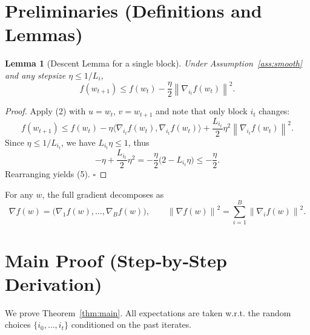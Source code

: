 \documentclass{article}
\newtheorem{lemma}{Lemma}
\newcommand{\norm}[1]{\left\|#1\right\|}
\newcommand{\grad}{\nabla}
\begin{document}
\section*{Preliminaries (Definitions and Lemmas)}
\begin{lemma}[Descent Lemma for a single block]\label{lem:descent}
Under Assumption~\ref{ass:smooth} and any stepsize $\eta\le 1/L_i$,
\[
f(w_{t+1})\le f(w_t)-\frac{\eta}{2}\norm{\grad_{i_t}f(w_t)}^{2}.
\tag{5}
\]
\end{lemma}
\begin{proof}
Apply (2) with $u=w_t$, $v=w_{t+1}$ and note that only block $i_t$ changes:
\[
f(w_{t+1})\le f(w_t)-\eta\langle \grad_{i_t}f(w_t),\grad_{i_t}f(w_t)\rangle
+\frac{L_{i_t}}{2}\eta^{2}\norm{\grad_{i_t}f(w_t)}^{2}.
\]
Since $\eta\le 1/L_{i_t}$, we have $L_{i_t}\eta\le1$, thus
\[
-\eta+\frac{L_{i_t}}{2}\eta^{2}
=-\frac{\eta}{2}\bigl(2-L_{i_t}\eta\bigr)\le -\frac{\eta}{2}.
\]
Rearranging yields (5). \hfill $\square$
\end{proof}
\begin{remark}
For any $w$, the full gradient decomposes as
\[
\grad f(w)=\bigl(\grad_1 f(w),\dots,\grad_B f(w)\bigr),\qquad
\norm{\grad f(w)}^{2}=\sum_{i=1}^{B}\norm{\grad_i f(w)}^{2}.
\tag{5a}
\]
\end{remark}

\section*{Main Proof (Step‑by‑Step Derivation)}
We prove Theorem~\ref{thm:main}.  All expectations are taken w.r.t. the
random choices $\{i_0,\dots ,i_{t}\}$ conditioned on the past iterates.
\end{document}
